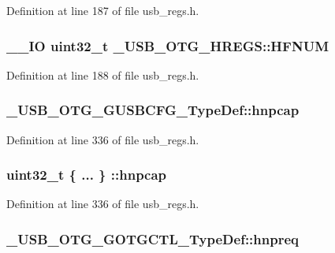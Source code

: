 Definition at line 187 of file usb\-\_\-regs.\-h.

\hypertarget{group___u_s_b___o_t_g___d_r_i_v_e_r_gae4ad9b94bbef9b3687675e5b97ed31d7}{
\subsubsection[{H\-F\-N\-U\-M}]{\setlength{\rightskip}{0pt plus 5cm}\-\_\-\-\_\-\-I\-O {\bf uint32\-\_\-t} \-\_\-\-U\-S\-B\-\_\-\-O\-T\-G\-\_\-\-H\-R\-E\-G\-S\-::\-H\-F\-N\-U\-M}}\label{group___u_s_b___o_t_g___d_r_i_v_e_r_gae4ad9b94bbef9b3687675e5b97ed31d7}


Definition at line 188 of file usb\-\_\-regs.\-h.

\hypertarget{group___u_s_b___o_t_g___d_r_i_v_e_r_gad727873756c868d916c2f2bec5f57dd8}{
\subsubsection[{hnpcap}]{ \-\_\-\-U\-S\-B\-\_\-\-O\-T\-G\-\_\-\-G\-U\-S\-B\-C\-F\-G\-\_\-\-Type\-Def\-::hnpcap}}\label{group___u_s_b___o_t_g___d_r_i_v_e_r_gad727873756c868d916c2f2bec5f57dd8}


Definition at line 336 of file usb\-\_\-regs.\-h.

\hypertarget{group___u_s_b___o_t_g___d_r_i_v_e_r_gaa8b2208da8ef46729c1302bbfde8ad14}{
\subsubsection[{hnpcap}]{\setlength{\rightskip}{0pt plus 5cm}uint32\-\_\-t \{ ... \} \-::hnpcap}}\label{group___u_s_b___o_t_g___d_r_i_v_e_r_gaa8b2208da8ef46729c1302bbfde8ad14}


Definition at line 336 of file usb\-\_\-regs.\-h.

\hypertarget{group___u_s_b___o_t_g___d_r_i_v_e_r_gaf3e9c6ede6612d1d7229ccc6d201a595}{
\subsubsection[{hnpreq}]{ \-\_\-\-U\-S\-B\-\_\-\-O\-T\-G\-\_\-\-G\-O\-T\-G\-C\-T\-L\-\_\-\-Type\-Def\-::hnpreq}}\label{group___u_s_b___o_t_g___d_r_i_v_e_r_gaf3e9c6ede6612d1d7229ccc6d201a595}


